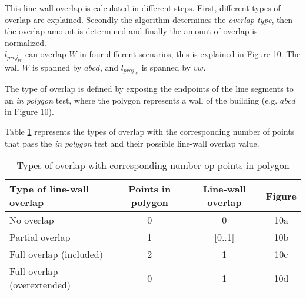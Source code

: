 	This line-wall overlap is calculated in different steps.
	First, different types of overlap are explained. Secondly the algorithm
	determines the \emph{overlap type}, then the overlap amount is determined and
	finally the amount of overlap is normalized.\\

	$l_{proj_W}$ can overlap $W$ in four different scenarios, this is explained
	in Figure 10. The wall $W$ is spanned by $abcd$, and $l_{proj_W}$ is spanned
	by $vw$.
	


		


	The type of overlap is defined by exposing the endpoints of the line
	segments to an \emph{in polygon} test, where the polygon represents a 
	wall of the building (e.g. $abcd$ in Figure 10).

	Table \ref{tab:lwatypes} represents the types of overlap with the corresponding number of points
	that pass the \emph{in polygon} test and their possible line-wall overlap
	value.\\ 

	\begin{table}[ht]
		\caption{Types of overlap with corresponding number op points in polygon}
		\label{tab:lwatypes}

		\begin{tabular}{|l||c|c|c|}
		\hline
		Type of line-wall overlap 			&	Points in polygon 			& Line-wall overlap & Figure \\
		\hline
		\hline
		No overlap					&	0					& 0		& 10a\\
		\hline
		Partial overlap 				&	1					& [0..1]	& 10b\\
		\hline
		Full overlap (included)		&	2					& 1		& 10c\\
		\hline
		Full overlap (overextended)		&  	0					& 1 		& 10d\\
		\hline
		\end{tabular}
	\end{table}

